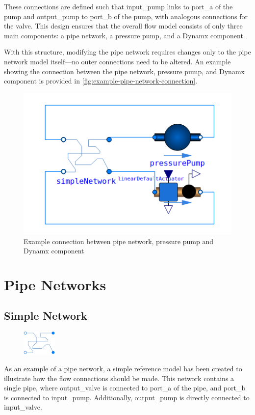 \documentclass[we,final,11pt,oneside,openany]{uantwerpenbamathesis}
\begin{document}
These connections are defined such that input\_pump links to port\_a of the pump and output\_pump to port\_b of the pump, with analogous connections for the valve.
This design ensures that the overall flow model consists of only three main components: a pipe network, a pressure pump, and a Dynamx component.

With this structure, modifying the pipe network requires changes only to the pipe network model itself—no outer connections need to be altered.
An example showing the connection between the pipe network, pressure pump, and Dynamx component is provided in \autoref{fig:example-pipe-network-connection}.

\begin{figure}[h!]
    \centering
    \includegraphics[width=0.4\linewidth]{Images/components/example_connection_pipe_network}
    \caption{Example connection between pipe network, pressure pump and Dynamx component}
    \label{fig:example-pipe-network-connection}
\end{figure}


\section{Pipe Networks}
\label{sec:pipe-networks}

\subsection{Simple Network}
\label{subsec:simple-network}

\begin{figure}
    \centering
    \includegraphics[width=0.15\textwidth]{Images/components/pipe-network}
\end{figure}

As an example of a pipe network, a simple reference model has been created to illustrate how the flow connections should be made.
This network contains a single pipe, where output\_valve is connected to port\_a of the pipe, and port\_b is connected to input\_pump.
Additionally, output\_pump is directly connected to input\_valve.
\end{document}
